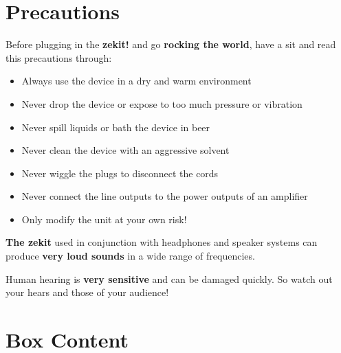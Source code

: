 \documentclass{scrartcl}
\begin{document}

\section{Precautions}
Before plugging in the \textbf{zekit!} and go \textbf{rocking the world}, have a sit and read this precautions through:

\begin{itemize}
    \item Always use the device in a dry and warm environment
    \item Never drop the device or expose to too much pressure or vibration
    \item Never spill liquids or bath the device in beer
    \item Never clean the device with an aggressive solvent
    \item Never wiggle the plugs to disconnect the cords
    \item Never connect the line outputs to the power outputs of an amplifier
    \item Only modify the unit at your own risk!
\end{itemize}

\textbf{The zekit} used in conjunction with headphones and speaker systems can produce \textbf{very loud sounds} in a wide range of frequencies.

Human hearing is \textbf{very sensitive} and can be damaged quickly. So watch out your hears and those of your audience!

\pagebreak


\section{Box Content}
\end{document}

